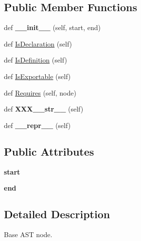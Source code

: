 \subsection*{Public Member Functions}
\begin{DoxyCompactItemize}
\item 
\mbox{\label{classcpp_1_1ast_1_1_node_a2cbd6969346645259afc3be51faae904}} 
def {\bfseries \+\_\+\+\_\+init\+\_\+\+\_\+} (self, start, end)
\item 
def \mbox{\hyperlink{classcpp_1_1ast_1_1_node_ab3eca703a79fb65bc25dfbcb7547c79e}{Is\+Declaration}} (self)
\item 
def \mbox{\hyperlink{classcpp_1_1ast_1_1_node_a684ee9a357168e7e07a24fc6812f66e6}{Is\+Definition}} (self)
\item 
def \mbox{\hyperlink{classcpp_1_1ast_1_1_node_a313273874ccf578485006d4000128234}{Is\+Exportable}} (self)
\item 
def \mbox{\hyperlink{classcpp_1_1ast_1_1_node_a31ae211f954a8c578ef16226df5ac8c8}{Requires}} (self, node)
\item 
\mbox{\label{classcpp_1_1ast_1_1_node_ab5dfeabcbcd7c1f5feb8522edffb8b4a}} 
def {\bfseries X\+X\+X\+\_\+\+\_\+str\+\_\+\+\_\+} (self)
\item 
\mbox{\label{classcpp_1_1ast_1_1_node_ab89915656a60c7b7c752e5baa607c532}} 
def {\bfseries \+\_\+\+\_\+repr\+\_\+\+\_\+} (self)
\end{DoxyCompactItemize}
\subsection*{Public Attributes}
\begin{DoxyCompactItemize}
\item 
\mbox{\label{classcpp_1_1ast_1_1_node_a7b2aa97e6a049bb1a93aea48c48f1f44}} 
{\bfseries start}
\item 
\mbox{\label{classcpp_1_1ast_1_1_node_a3c5e5246ccf619df28eca02e29d69647}} 
{\bfseries end}
\end{DoxyCompactItemize}


\subsection{Detailed Description}
\begin{DoxyVerb}Base AST node.\end{DoxyVerb}
 

